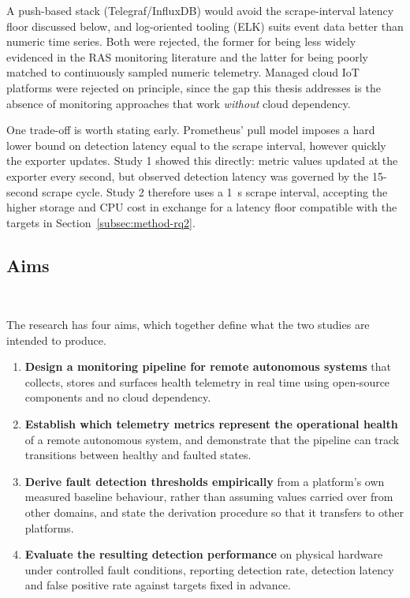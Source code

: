A push-based stack (Telegraf/InfluxDB) would avoid the scrape-interval latency
floor discussed below, and log-oriented tooling (ELK) suits event data better
than numeric time series. Both were rejected, the former for being less widely
evidenced in the RAS monitoring literature and the latter for being poorly
matched to continuously sampled numeric telemetry. Managed cloud IoT platforms
were rejected on principle, since the gap this thesis addresses is the absence of
monitoring approaches that work \textit{without} cloud dependency.

One trade-off is worth stating early. Prometheus' pull model imposes a hard lower
bound on detection latency equal to the scrape interval, however quickly the
exporter updates. Study 1 showed this directly: metric values updated at the
exporter every second, but observed detection latency was governed by the
15-second scrape cycle. Study 2 therefore uses a \SI{1}{\second} scrape interval,
accepting the higher storage and CPU cost in exchange for a latency floor
compatible with the targets in Section~\ref{subsec:method-rq2}.

\subsection{Aims}~\label{subsec:method-aims}

The research has four aims, which together define what the two studies are
intended to produce.

\begin{enumerate}
    \item \textbf{Design a monitoring pipeline for remote autonomous systems}
    that collects, stores and surfaces health telemetry in real time using
    open-source components and no cloud dependency.
    \item \textbf{Establish which telemetry metrics represent the operational
    health} of a remote autonomous system, and demonstrate that the pipeline can
    track transitions between healthy and faulted states.
    \item \textbf{Derive fault detection thresholds empirically} from a
    platform's own measured baseline behaviour, rather than assuming values
    carried over from other domains, and state the derivation procedure so that
    it transfers to other platforms.
    \item \textbf{Evaluate the resulting detection performance} on physical
    hardware under controlled fault conditions, reporting detection rate,
    detection latency and false positive rate against targets fixed in advance.
\end{enumerate}

